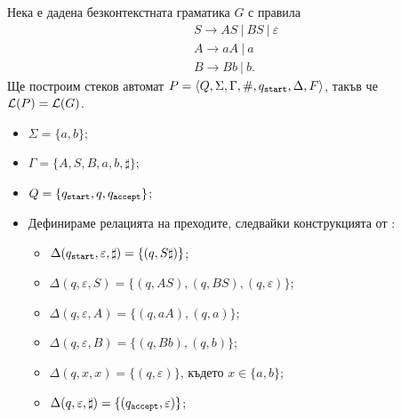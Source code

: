 \begin{extra}
\begin{example}
  Нека е дадена безконтекстната граматика $G$ с правила 
  \begin{align*}
    & S \to AS\ |\ BS\ |\ \varepsilon\\
    & A \to aA\ |\ a\\
    & B \to Bb\ |\ b.
  \end{align*}
  Ще построим стеков автомат $P = \langle{Q,\Sigma,\Gamma,\#,q_{\texttt{start}},\Delta,F}\rangle$, такъв че $\mathcal{L}(P) = \mathcal{L}(G)$.
  \begin{itemize}
  \item
    $\Sigma = \{a,b\}$;
  \item 
    $\Gamma = \{A,S,B,a,b,\sharp\}$;
  \item
    $Q = \{q_{\texttt{start}},q,q_{\texttt{accept}}\}$;
  \item
    Дефинираме релацията на преходите, следвайки конструкцията от :
    \begin{itemize}
    \item
      $\Delta(q_{\texttt{start}}, \varepsilon, \sharp) = \{(q, S\sharp)\}$;
    \item 
      $\Delta(q, \varepsilon, S) = \{(q, AS), (q, BS), (q, \varepsilon)\}$;
    \item
      $\Delta(q, \varepsilon, A) = \{(q, aA), (q, a)\}$;
    \item
      $\Delta(q, \varepsilon, B) = \{(q, Bb), (q, b)\}$;
    \item
      $\Delta(q, x, x) = \{(q, \varepsilon)\}$, където $x \in \{a,b\}$;
    \item
      $\Delta(q, \varepsilon, \sharp) = \{(q_{\texttt{accept}},\varepsilon)\}$;
    \end{itemize}
  \end{itemize}
\end{example}
\end{extra}

